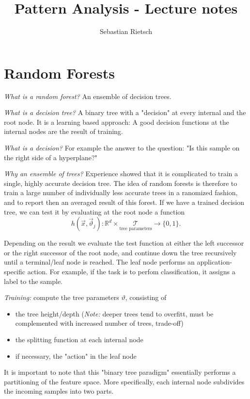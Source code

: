 \documentclass{scrartcl}
\title{Pattern Analysis - Lecture notes}
\author{Sebastian Rietsch}
\begin{document}
\maketitle
\tableofcontents
\section{Random Forests}
\textit{What is a random forest?} An ensemble of decision trees.

\textit{What is a decision tree?} A binary tree with a "decision" at every internal and the root node. It is a learning based approach: A good decision functions at the internal nodes are the result of training.

\textit{What is a decision?} For example the answer to the question: "Is this sample on the right side of a hyperplane?"

\textit{Why an ensemble of trees?} Experience showed that it is complicated to train a single, highly accurate decision tree. The idea of random forests is therefore to train a large number of individually less accurate trees in a ranomized fashion, and to report then an averaged result of this forest. 
If we have a trained decision tree, we can test it by evaluating at the root node a function
\[h(\vec{x}, \vec{\vartheta}_j): \mathbb{R}^d \times \underset{\text{tree parameters}}{\mathcal{T}} \rightarrow \{0, 1\}.\]

Depending on the result we evaluate the test function at either the left successor or the right successor of the root node, and continue down the tree recursively until a terminal/leaf node is reached.
The leaf node performs an application-specific action. For example, if the task is to perfom classification, it assigns a label to the sample.

\textit{Training:} compute the tree parameters \(\vartheta\), consisting of
\begin{itemize}
    \item
        the tree height/depth (\textit{Note:} deeper trees tend to overfitt, must be complemented with increased number of trees, trade-off)
    \item
        the splitting function at each internal node
    \item
        if necessary, the "action" in the leaf node
\end{itemize}

It is important to note that this "binary tree paradigm" essentially performs a partitioning of the feature space. More specifically, each internal node subdivides the incoming samples into two parts.
\end{document}
